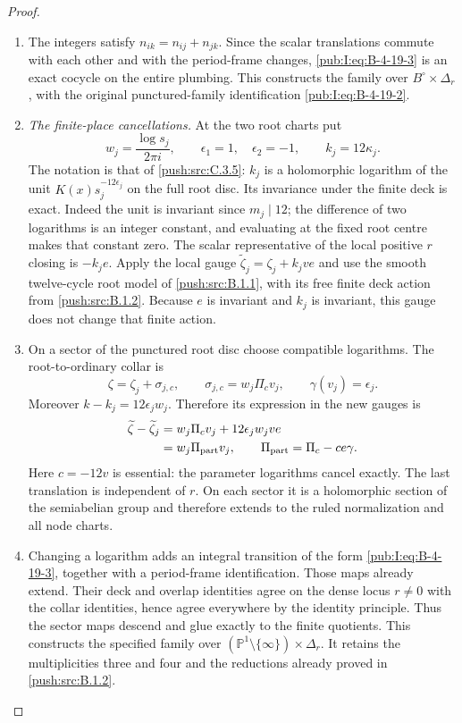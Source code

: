 \begin{proof}
\begin{enumerate}[label=\arabic*.,leftmargin=*]
\item The integers satisfy
$n_{ik}=n_{ij}+n_{jk}$. Since the scalar translations
commute with each other and with the period-frame
changes, \eqref{pub:I:eq:B-4-19-3} is an exact cocycle on the entire
plumbing. This constructs the family over
$B^\circ\times\Delta_r$, with the original
punctured-family identification \eqref{pub:I:eq:B-4-19-2}.

\item \emph{The finite-place cancellations.}
At the two root charts put
\[
 w_j=\frac{\log s_j}{2\pi i},\qquad
 \epsilon_1=1,\quad\epsilon_2=-1,
 \qquad k_j=12\kappa_j.
\]
The notation is that of \ref{push:src:C.3.5}: $k_j$ is a
holomorphic logarithm of the unit
$K(x)s_j^{-12\epsilon_j}$ on the full root disc.
Its invariance under the finite deck is exact.
Indeed the unit is invariant since $m_j\mid12$;
the difference of two logarithms is an integer
constant, and evaluating at the fixed root centre
makes that constant zero. The scalar representative
of the local positive $r$ closing is $-k_j e$.
Apply the local gauge
$\widetilde\zeta_j=\zeta_j+k_jve$ and use the
smooth twelve-cycle root model of \ref{push:src:B.1.1}, with its
free finite deck action from \ref{push:src:B.1.2}. Because $e$ is
invariant and $k_j$ is invariant, this gauge does
not change that finite action.

\item On a sector of the punctured root disc choose
compatible logarithms. The root-to-ordinary
collar is
\[
 \zeta=\zeta_j+\sigma_{j,c},\qquad
 \sigma_{j,c}=w_j\Pi_c v_j,
 \qquad \gamma(v_j)=\epsilon_j.
\]
Moreover $k-k_j=12\epsilon_jw_j$. Therefore its
expression in the new gauges is
\begin{equation}
 \begin{aligned}
 \widetilde\zeta-\widetilde\zeta_j
 &=w_j\Pi_c v_j+12\epsilon_jw_jve\\
 &=w_j\Pi_{\rm part}v_j,
 \qquad \Pi_{\rm part}=\Pi_c-ce\gamma.
 \end{aligned}
\label{pub:I:eq:B-4-19-4}
\end{equation}
Here $c=-12v$ is essential: the parameter logarithms
cancel exactly. The last translation is independent
of $r$. On each sector it is a holomorphic section
of the semiabelian group and therefore extends to
the ruled normalization and all node charts.

\item Changing a logarithm adds an integral transition
of the form \eqref{pub:I:eq:B-4-19-3}, together with a
period-frame identification. Those maps already
extend. Their deck and overlap identities agree
on the dense locus $r\ne0$ with the collar
identities, hence agree everywhere by the identity
principle. Thus the sector maps descend and glue
exactly to the finite quotients. This constructs
the specified family over
$(\mathbb P^1\setminus\{\infty\})\times\Delta_r$.
It retains the multiplicities three and four and
the reductions already proved in \ref{push:src:B.1.2}.


\end{enumerate}
\end{proof}
